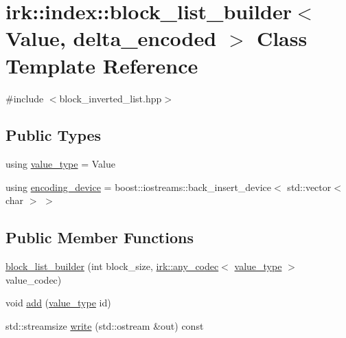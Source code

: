 \hypertarget{classirk_1_1index_1_1block__list__builder}{}\section{irk\+:\+:index\+:\+:block\+\_\+list\+\_\+builder$<$ Value, delta\+\_\+encoded $>$ Class Template Reference}
\label{classirk_1_1index_1_1block__list__builder}


{\ttfamily \#include $<$block\+\_\+inverted\+\_\+list.\+hpp$>$}

\subsection*{Public Types}
\begin{DoxyCompactItemize}
\item 
using \mbox{\hyperlink{classirk_1_1index_1_1block__list__builder_a719a9c8b64ca17f48969aa811b2a5b1d}{value\+\_\+type}} = Value
\item 
using \mbox{\hyperlink{classirk_1_1index_1_1block__list__builder_a1b5dc6c77e6d19759905b54a2f4e534a}{encoding\+\_\+device}} = boost\+::iostreams\+::back\+\_\+insert\+\_\+device$<$ std\+::vector$<$ char $>$ $>$
\end{DoxyCompactItemize}
\subsection*{Public Member Functions}
\begin{DoxyCompactItemize}
\item 
\mbox{\hyperlink{classirk_1_1index_1_1block__list__builder_a93eb7cefd4246189db44c728051ca9a0}{block\+\_\+list\+\_\+builder}} (int block\+\_\+size, \mbox{\hyperlink{namespaceirk_a831a3a869cf19601dbfb5c41765a2e87}{irk\+::any\+\_\+codec}}$<$ \mbox{\hyperlink{classirk_1_1index_1_1block__list__builder_a719a9c8b64ca17f48969aa811b2a5b1d}{value\+\_\+type}} $>$ value\+\_\+codec)
\item 
void \mbox{\hyperlink{classirk_1_1index_1_1block__list__builder_a59c0f1b2578902b115d23060b60b13c8}{add}} (\mbox{\hyperlink{classirk_1_1index_1_1block__list__builder_a719a9c8b64ca17f48969aa811b2a5b1d}{value\+\_\+type}} id)
\item 
std\+::streamsize \mbox{\hyperlink{classirk_1_1index_1_1block__list__builder_a470564f1666a0a5370a8d917e5d50c3a}{write}} (std\+::ostream \&out) const
\end{DoxyCompactItemize}


